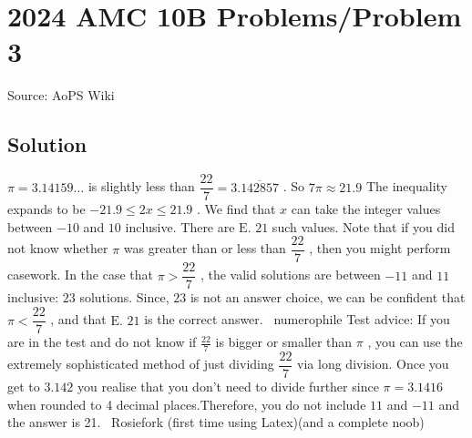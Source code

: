 \documentclass[12pt]{article}
\begin{document}
\section*{{2024 AMC 10B Problems/Problem 3}}
Source: AoPS Wiki

\subsection*{Solution}
$\pi = 3.14159\dots$ is slightly less than $\dfrac{22}{7} = 3.\overline{142857}$ . So $7\pi \approx 21.9$ The inequality expands to be $-21.9 \le 2x \le 21.9$ . We find that $x$ can take the integer values between $-10$ and $10$ inclusive. There are $\boxed{\text{E. }21}$ such values. Note that if you did not know whether $\pi$ was greater than or less than $\dfrac{22}{7}$ , then you might perform casework. In the case that $\pi > \dfrac{22}{7}$ , the valid solutions are between $-11$ and $11$ inclusive: $23$ solutions. Since, $23$ is not an answer choice, we can be confident that $\pi < \dfrac{22}{7}$ , and that $\boxed{\text{E. } 21}$ is the correct answer. ~numerophile Test advice: If you are in the test and do not know if $\frac{22}{7}$ is bigger or smaller than $\pi$ , you can use the extremely sophisticated method of just dividing $\dfrac{22}{7}$ via long division. Once you get to $3.142$ you realise that you don't need to divide further since $\pi = 3.1416$ when rounded to 4 decimal places.Therefore, you do not include $11$ and $-11$ and the answer is 21. ~Rosiefork (first time using Latex)(and a complete noob)
\end{document}
